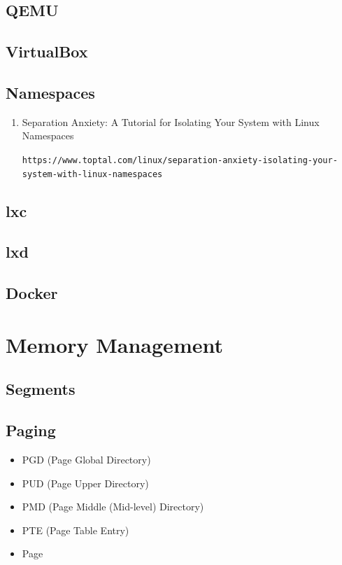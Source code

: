 \documentclass[12pt,a4paper]{article}
\begin{document}
\subsection{QEMU}

\subsection{VirtualBox}

\subsection{Namespaces}

\begin{enumerate}

\item Separation Anxiety: A Tutorial for Isolating Your System with Linux Namespaces

	\texttt{https://www.toptal.com/linux/separation-anxiety-isolating-your-system-with-linux-namespaces}

\end{enumerate}

\subsection{lxc}

\subsection{lxd}

\subsection{Docker}

\section{Memory Management}

\subsection{Segments}

\subsection{Paging}

\begin{itemize}
\item PGD (Page Global Directory)
\item PUD (Page Upper Directory)
\item PMD (Page Middle (Mid-level) Directory)
\item PTE (Page Table Entry)
\item Page
\end{itemize}
\end{document}
